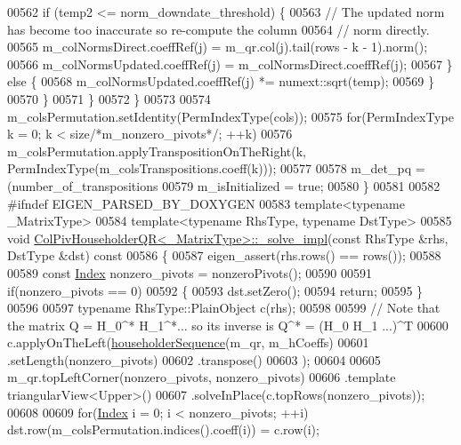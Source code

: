 \begin{DoxyCode}
00562         \textcolor{keywordflow}{if} (temp2 <= norm\_downdate\_threshold) \{
00563           \textcolor{comment}{// The updated norm has become too inaccurate so re-compute the column}
00564           \textcolor{comment}{// norm directly.}
00565           m\_colNormsDirect.coeffRef(j) = m\_qr.col(j).tail(rows - k - 1).norm();
00566           m\_colNormsUpdated.coeffRef(j) = m\_colNormsDirect.coeffRef(j);
00567         \} \textcolor{keywordflow}{else} \{
00568           m\_colNormsUpdated.coeffRef(j) *= numext::sqrt(temp);
00569         \}
00570       \}
00571     \}
00572   \}
00573 
00574   m\_colsPermutation.setIdentity(PermIndexType(cols));
00575   \textcolor{keywordflow}{for}(PermIndexType k = 0; k < size\textcolor{comment}{/*m\_nonzero\_pivots*/}; ++k)
00576     m\_colsPermutation.applyTranspositionOnTheRight(k, PermIndexType(m\_colsTranspositions.coeff(k)));
00577 
00578   m\_det\_pq = (number\_of\_transpositions%
00579   m\_isInitialized = \textcolor{keyword}{true};
00580 \}
00581 
00582 \textcolor{preprocessor}{#ifndef EIGEN\_PARSED\_BY\_DOXYGEN}
00583 \textcolor{keyword}{template}<\textcolor{keyword}{typename} \_MatrixType>
00584 \textcolor{keyword}{template}<\textcolor{keyword}{typename} RhsType, \textcolor{keyword}{typename} DstType>
00585 \textcolor{keywordtype}{void} \hyperlink{group___q_r___module_class_eigen_1_1_col_piv_householder_q_r}{ColPivHouseholderQR<\_MatrixType>::\_solve\_impl}(\textcolor{keyword}{const} 
      RhsType &rhs, DstType &dst)\textcolor{keyword}{ const}
00586 \textcolor{keyword}{}\{
00587   eigen\_assert(rhs.rows() == rows());
00588 
00589   \textcolor{keyword}{const} \hyperlink{namespace_eigen_a62e77e0933482dafde8fe197d9a2cfde}{Index} nonzero\_pivots = nonzeroPivots();
00590 
00591   \textcolor{keywordflow}{if}(nonzero\_pivots == 0)
00592   \{
00593     dst.setZero();
00594     \textcolor{keywordflow}{return};
00595   \}
00596 
00597   \textcolor{keyword}{typename} RhsType::PlainObject c(rhs);
00598 
00599   \textcolor{comment}{// Note that the matrix Q = H\_0^* H\_1^*... so its inverse is Q^* = (H\_0 H\_1 ...)^T}
00600   c.applyOnTheLeft(\hyperlink{group___householder___module_ga4bd4b85120e014cf1125a054b02d4d92}{householderSequence}(m\_qr, m\_hCoeffs)
00601                     .setLength(nonzero\_pivots)
00602                     .transpose()
00603     );
00604 
00605   m\_qr.topLeftCorner(nonzero\_pivots, nonzero\_pivots)
00606       .template triangularView<Upper>()
00607       .solveInPlace(c.topRows(nonzero\_pivots));
00608 
00609   \textcolor{keywordflow}{for}(\hyperlink{namespace_eigen_a62e77e0933482dafde8fe197d9a2cfde}{Index} i = 0; i < nonzero\_pivots; ++i) dst.row(m\_colsPermutation.indices().coeff(i)) = c.row(i);

\end{DoxyCode}
